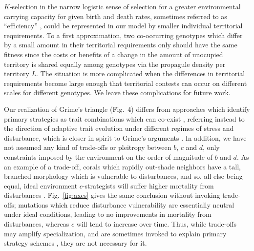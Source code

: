 \documentclass[11pt]{article}
\begin{document}
$K$-selection in the narrow logistic sense of selection for a greater environmental carrying capacity for given birth and death rates, sometimes referred to as ``efficiency'' \citep{macarthur_1967}, could be represented in our model by smaller individual territorial requirements. To a first approximation, two co-occurring genotypes which differ by a small amount in their territorial requirements only should have the same fitness since the costs or benefits of a change in the amount of unocupied territory is shared equally among genotypes via the propagule density per territory $L$. The situation is more complicated when the differences in territorial requirements become large enough that territorial contests can occur on different scales for different genotypes. We leave these complications for future work. 

Our realization of Grime's triangle (Fig.~4) differs from approaches which identify primary strategies as trait combinations which can co-exist \citep{bolker_99}, referring instead to the direction of adaptive trait evolution under different regimes of stress and disturbance, which is closer in spirit to Grime's arguments \citep{grime_1974,grime_1977}. In addition, we have not assumed any kind of trade-offs or pleitropy between $b$, $c$ and $d$, only constraints imposed by the environment on the order of magnitude of $b$ and $d$. As an example of a trade-off, corals which rapidly out-shade neighbors have a tall, branched morphology which is vulnerable to disturbances, and so, all else being equal, ideal environment $c$-strategists will suffer higher mortality from disturbances \citep{darling_2012}. Fig.~\ref{fig:axes} gives the same conclusion without invoking trade-offs; mutations which reduce disturbance vulnerability are essentially neutral under ideal conditions, leading to no improvements in mortality from disturbances, whereas $c$ will tend to increase over time. Thus, while trade-offs may amplify specialization, and are sometimes invoked to explain primary strategy schemes \citep{macarthur_1967,winemiller_1992,aerts_1999}, they are not necessary for it.
\end{document}
